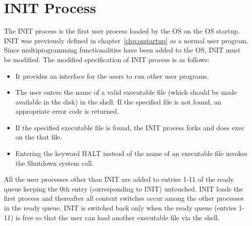 \documentclass[11pt]{report}
\begin{document}
\section{INIT Process}
The INIT process is the first user process loaded by the OS on the OS startup. INIT was previously defined in chapter~\ref{chp:osstartup} as a normal user program. Since multiprogramming functionalities have been added to the OS, INIT must be modified. The modified specification of INIT process is as follows:
\begin{itemize}
	\item  It provides an interface for the users to run other user programs.
	\item The user enters the name of a valid executable file (which should be made available in the disk) in the shell. If the specified file is not found, an appropriate error code is returned.
	\item If the specified executable file is found, the INIT process forks and does exec on the that file.
	\item Entering the keyword HALT instead of the name of an executable file invokes the Shutdown system call.
\end{itemize}

All the user processes other than INIT are added to entries 1-11 of the ready queue keeping the 0th entry (corresponding to INIT) untouched. INIT loads the first process and thereafter all context switches occur among the other processes in the ready queue. INIT is switched back only when the ready queue (entries 1-11) is free so that the user can load another executable file via the shell. 

% 
% 
\end{document}

